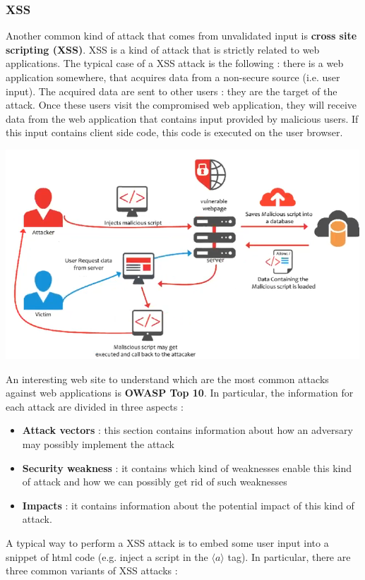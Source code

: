 \subsubsection{XSS}
Another common kind of attack that comes from unvalidated input is \textbf{cross site scripting (XSS)}. XSS is a kind of attack that is strictly related to web applications. The typical case of a XSS attack is the following : there is a web application somewhere, that acquires data from a non-secure source (i.e. user input). The acquired data are sent to other users : they are the target of the attack. Once these users visit the compromised web application, they will receive data from the web application that contains input provided by malicious users. If this input contains client side code, this code is executed on the user browser. 
\begin{center}
\includegraphics[scale=0.4]{./images/xss_scenario.png}
\end{center}
An interesting web site to understand which are the most common attacks against web applications is \textbf{OWASP Top 10}. In particular, the information for each attack are divided in three aspects :
\begin{itemize}
\item \textbf{Attack vectors} : this section contains information about how an adversary may possibly implement the attack
\item \textbf{Security weakness} : it contains which kind of weaknesses enable this kind of attack and how we can possibly get rid of such weaknesses
\item \textbf{Impacts} : it contains information about the potential impact of this kind of attack.
\end{itemize}
A typical way to perform a XSS attack is to embed some user input into a snippet of html code (e.g. inject a script in the $\langle a \rangle$ tag). In particular, there are three common variants of XSS attacks :
